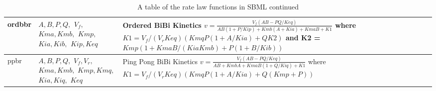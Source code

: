 \documentclass[10pt]{article}
\begin{document}
\begin{table}[h]
\begin{tabular}{|p{1cm}|p{2cm}|p{13cm}|}
ordbbr & $ A, B, P, Q, $ $ V_f, $ $ Kma, Kmb, $ $ Kmp, $ $ Kia,
Kib, $ $ Kip, Keq $ & Ordered BiBi Kinetics $ v = \frac{V_f
\left( A B - P Q/Keq\right) }{A B \left( 1 + P/Kip\right) + Kmb
(A + Kia) + Kma B + K1} $ where $ K1 =V_f / (V_r Keq) \left(
Kmq P \left( 1 + A/Kia\right) + Q K2 \right) $ and
 K2 = $ Kmp \left(
1 + Kma B /(Kia Kmb) + P \left( 1 + B/Kib \right) \right) $ \\
\hline

ppbr & $ A, B, P, Q, $ $ V_f, V_r, $ $ Kma, Kmb, $ $ Kmp, Kmq, $ $
Kia, Kiq, $ $ Keq$ & Ping Pong BiBi Kinetics $ v = \frac{V_f
\left( A B - P Q /Keq \right) }{A B + Kmb A + Kma B \left( 1 +
Q/Kiq\right)+ K1 } $ where $ K1 = V_f/(V_r Keq)
\left( Kmq P \left( 1 + A/Kia \right) + Q (Kmp + P) \right) $   \\
\hline

\end{tabular}
\caption{A table of the rate law functions in SBML continued}
\end{table}
\end{document}
